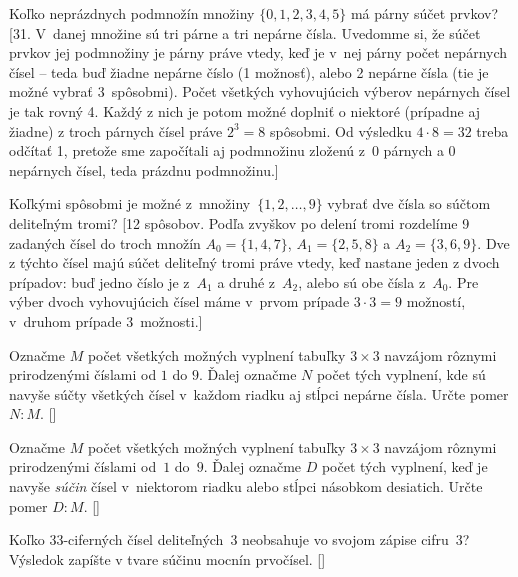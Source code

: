 {Koľko neprázdnych podmnožín množiny $\{0,1,2,3,4,5\}$
má párny súčet prvkov?
[31. V~danej množine sú tri párne a tri nepárne čísla.
Uvedomme si, že súčet prvkov jej podmnožiny je
párny práve vtedy, keď je v~nej párny počet nepárnych čísel -- teda buď žiadne
nepárne číslo (1 možnosť), alebo 2 nepárne čísla (tie je možné vybrať 3~spôsobmi). Počet všetkých vyhovujúcich výberov nepárnych čísel je tak
rovný 4. Každý z nich je potom možné doplniť o niektoré (prípadne aj žiadne)
z troch párnych čísel práve $2^3=8$ spôsobmi. Od výsledku $4\cdot 8=32$
treba odčítať 1, pretože sme započítali aj podmnožinu zloženú
z~0 párnych a 0 nepárnych čísel, teda prázdnu podmnožinu.]

Koľkými spôsobmi je možné z~množiny~$\{1,2,\ldots,9\}$ vybrať dve čísla
so súčtom deliteľným tromi?
[12 spôsobov. Podľa zvyškov po delení tromi
rozdelíme 9 zadaných čísel do troch množín $A_0=\{1,4,7\}$,
$A_1=\{2,5,8\}$ a $A_2=\{3,6,9\}$. Dve z týchto čísel majú
súčet deliteľný tromi práve vtedy, keď nastane jeden z dvoch prípadov:
buď jedno číslo je z~$A_1$ a druhé z~$A_2$, alebo sú obe čísla z~$A_0$.
Pre výber dvoch vyhovujúcich čísel máme v~prvom prípade $3\cdot3=9$
možností, v~druhom prípade 3~možnosti.]

\D
Označme $M$ počet všetkých možných vyplnení tabuľky $3\times 3$ navzájom rôznymi prirodzenými číslami od $1$ do $9$.
Ďalej označme $N$ počet tých vyplnení, kde sú navyše súčty všetkých čísel v~každom riadku aj stĺpci nepárne čísla. Určte pomer $N:M$.
[]

Označme $M$ počet všetkých možných vyplnení tabuľky $3 \times 3$
navzájom rôznymi prirodzenými číslami od~$1$ do~$9$.
Ďalej označme $D$ počet tých vyplnení, keď je navyše \emph{súčin} čísel v~niektorom riadku alebo stĺpci násobkom desiatich.
Určte pomer $D : M$.
[]

Koľko $33$-ciferných čísel deliteľných~$3$ neobsahuje vo svojom zápise cifru~3? Výsledok zapíšte v tvare súčinu mocnín prvočísel.
[]

}
